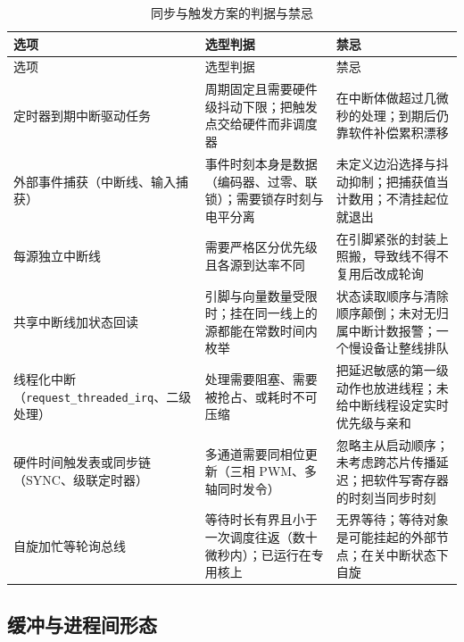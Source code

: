 \documentclass[12pt,a4paper,fontset=fandol]{ctexbook}
\newcommand{\Tp}[1]{\texttt{#1}}
\newcommand{\Bk}{\discretionary{}{}{}}
\begin{document}
\begin{longtable}{>{\raggedright\arraybackslash\footnotesize}p{}>{\raggedright\arraybackslash\footnotesize}p{}>{\raggedright\arraybackslash\footnotesize}p{}}
\caption{同步与触发方案的判据与禁忌}\label{tab:apC-sync} \\
\toprule
选项 & 选型判据 & 禁忌 \\
\midrule
\endfirsthead
\toprule
选项 & 选型判据 & 禁忌 \\
\midrule
\endhead
\bottomrule
\endfoot
\endlastfoot
定时器到期中断驱动任务 & 周期固定且需要硬件级抖动下限；把触发点交给硬件而非调度器 & 在中断体做超过几微秒的处理；到期后仍靠软件补偿累积漂移 \\
外部事件捕获（中断线、输入捕获） & 事件时刻本身是数据（编码器、过零、联锁）；需要锁存时刻与电平分离 & 未定义边沿选择与抖动抑制；把捕获值当计数用；不清挂起位就退出 \\
每源独立中断线 & 需要严格区分优先级且各源到达率不同 & 在引脚紧张的封装上照搬，导致线不得不复用后改成轮询 \\
共享中断线加状态回读 & 引脚与向量数量受限时；挂在同一线上的源都能在常数时间内枚举 & 状态读取顺序与清除顺序颠倒；未对无归属中断计数报警；一个慢设备让整线排队 \\
线程化中断（\Tp{request\_{\Bk}threaded\_{\Bk}irq}、二级处理） & 处理需要阻塞、需要被抢占、或耗时不可压缩 & 把延迟敏感的第一级动作也放进线程；未给中断线程设定实时优先级与亲和 \\
硬件时间触发表或同步链（SYNC、级联定时器） & 多通道需要同相位更新（三相 PWM、多轴同时发令） & 忽略主从启动顺序；未考虑跨芯片传播延迟；把软件写寄存器的时刻当同步时刻 \\
自旋加忙等轮询总线 & 等待时长有界且小于一次调度往返（数十微秒内）；已运行在专用核上 & 无界等待；等待对象是可能挂起的外部节点；在关中断状态下自旋 \\
\end{longtable}

\subsection{缓冲与进程间形态}
\end{document}

